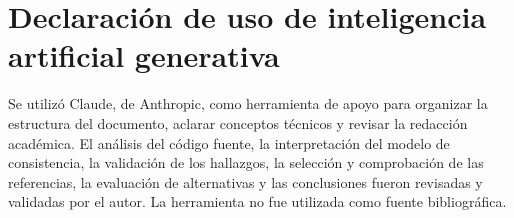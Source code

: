\documentclass[conference]{IEEEtran}
\begin{document}
\section*{Declaraci\'on de uso de inteligencia artificial generativa}

Se utiliz\'o Claude, de Anthropic, como herramienta de apoyo para organizar la estructura del documento, aclarar conceptos t\'ecnicos y revisar la redacci\'on acad\'emica. El an\'alisis del c\'odigo fuente, la interpretaci\'on del modelo de consistencia, la validaci\'on de los hallazgos, la selecci\'on y comprobaci\'on de las referencias, la evaluaci\'on de alternativas y las conclusiones fueron revisadas y validadas por el autor. La herramienta no fue utilizada como fuente bibliogr\'afica.
\end{document}
